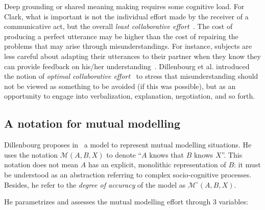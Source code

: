 \documentclass{sig-alternate}
\newcommand{\model}[3]{{$\mathcal{M}(#1, #2, #3)$}}
\newcommand{\Model}[3]{{$\mathcal{M}^{\circ}(#1, #2, #3)$}}
\begin{document}
Deep grounding or shared meaning making requires some cognitive load. For Clark,
what is important is not the individual effort made by the receiver of a
communicative act, but the overall \emph{least collaborative
effort}~\cite{clark1986referring}.  The cost of producing a perfect utterance
may be higher than the cost of repairing the problems that may arise through
misunderstandings. For instance, subjects are less careful about adapting their
utterances to their partner when they know they can provide feedback on his/her
understanding~\cite{schober1993spatial}. Dillenbourg et al. introduced the
notion of \emph{optimal collaborative effort}~\cite{dillenbourg1995evolution} to
stress that misunderstanding should not be viewed as something to be avoided (if
this was possible), but as an opportunity to engage into verbalization,
explanation, negotiation, and so forth.

\subsection{A notation for mutual modelling}
\label{cscl-model}

Dillenbourg proposes in~\cite{sangin2007partner} a model to represent mutual
modelling situations. He uses the notation \model{A}{B}{X} to denote ``$A$ knows
that $B$ knows $X$''. This notation does not mean $A$ has an explicit,
monolithic representation of $B$: it must be understood as an abstraction
referring to complex socio-cognitive processes. Besides, he refer to the
\emph{degree of accuracy} of the model as \Model{A}{B}{X}.

He parametrizes and assesses the mutual modelling effort through 3 variables:
\end{document}
